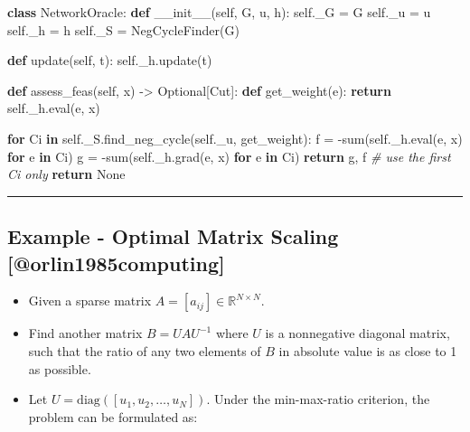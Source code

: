 \documentclass[
]{article}
\newenvironment{Shaded}{}{}
\newcommand{\BuiltInTok}[1]{\textcolor[rgb]{0.00,0.50,0.00}{#1}}
\newcommand{\CommentTok}[1]{\textcolor[rgb]{0.38,0.63,0.69}{\textit{#1}}}
\newcommand{\ControlFlowTok}[1]{\textcolor[rgb]{0.00,0.44,0.13}{\textbf{#1}}}
\newcommand{\FunctionTok}[1]{\textcolor[rgb]{0.02,0.16,0.49}{#1}}
\newcommand{\KeywordTok}[1]{\textcolor[rgb]{0.00,0.44,0.13}{\textbf{#1}}}
\newcommand{\NormalTok}[1]{#1}
\newcommand{\OperatorTok}[1]{\textcolor[rgb]{0.40,0.40,0.40}{#1}}
\newcommand{\VariableTok}[1]{\textcolor[rgb]{0.10,0.09,0.49}{#1}}
\begin{document}
\begin{Shaded}
\begin{Highlighting}[]
\KeywordTok{class}\NormalTok{ NetworkOracle:}
    \KeywordTok{def} \FunctionTok{\_\_init\_\_}\NormalTok{(}\VariableTok{self}\NormalTok{, G, u, h):}
        \VariableTok{self}\NormalTok{.\_G }\OperatorTok{=}\NormalTok{ G}
        \VariableTok{self}\NormalTok{.\_u }\OperatorTok{=}\NormalTok{ u}
        \VariableTok{self}\NormalTok{.\_h }\OperatorTok{=}\NormalTok{ h}
        \VariableTok{self}\NormalTok{.\_S }\OperatorTok{=}\NormalTok{ NegCycleFinder(G)}

    \KeywordTok{def}\NormalTok{ update(}\VariableTok{self}\NormalTok{, t):}
        \VariableTok{self}\NormalTok{.\_h.update(t)}

    \KeywordTok{def}\NormalTok{ assess\_feas(}\VariableTok{self}\NormalTok{, x) }\OperatorTok{{-}\textgreater{}}\NormalTok{ Optional[Cut]:}
        \KeywordTok{def}\NormalTok{ get\_weight(e):}
            \ControlFlowTok{return} \VariableTok{self}\NormalTok{.\_h.}\BuiltInTok{eval}\NormalTok{(e, x)}

        \ControlFlowTok{for}\NormalTok{ Ci }\KeywordTok{in} \VariableTok{self}\NormalTok{.\_S.find\_neg\_cycle(}\VariableTok{self}\NormalTok{.\_u, get\_weight):}
\NormalTok{            f }\OperatorTok{=} \OperatorTok{{-}}\BuiltInTok{sum}\NormalTok{(}\VariableTok{self}\NormalTok{.\_h.}\BuiltInTok{eval}\NormalTok{(e, x) }\ControlFlowTok{for}\NormalTok{ e }\KeywordTok{in}\NormalTok{ Ci)}
\NormalTok{            g }\OperatorTok{=} \OperatorTok{{-}}\BuiltInTok{sum}\NormalTok{(}\VariableTok{self}\NormalTok{.\_h.grad(e, x) }\ControlFlowTok{for}\NormalTok{ e }\KeywordTok{in}\NormalTok{ Ci)}
            \ControlFlowTok{return}\NormalTok{ g, f  }\CommentTok{\# use the first Ci only}
        \ControlFlowTok{return} \VariableTok{None}
\end{Highlighting}
\end{Shaded}

\begin{center}\rule{0.5\linewidth}{0.5pt}\end{center}

\subsection{Example - Optimal Matrix Scaling
{[}@orlin1985computing{]}}\label{example---optimal-matrix-scaling-orlin1985computing}

\begin{itemize}
\item
  Given a sparse matrix \(A = [a_{ij}] \in \mathbb{R}^{N\times N}\).
\item
  Find another matrix \(B = U A U^{-1}\) where \(U\) is a nonnegative
  diagonal matrix, such that the ratio of any two elements of \(B\) in
  absolute value is as close to 1 as possible.
\item
  Let \(U = \mathrm{diag}([u_1, u_2, \ldots, u_N])\). Under the
  min-max-ratio criterion, the problem can be formulated as:
\end{itemize}
\end{document}
